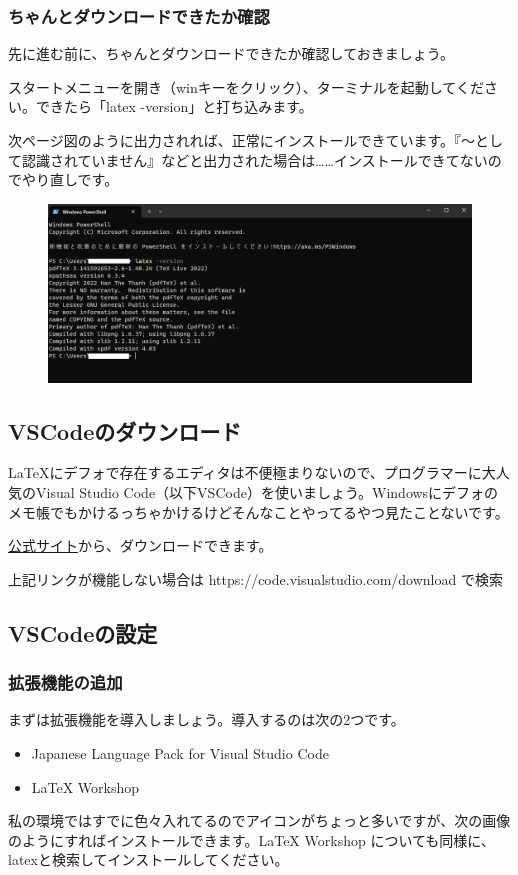 \documentclass[uplatex,dvipdfmx]{jsarticle}
\numberwithin{equation}{section}
\begin{document}
\subsubsection{ちゃんとダウンロードできたか確認}
先に進む前に、ちゃんとダウンロードできたか確認しておきましょう。

スタートメニューを開き（winキーをクリック）、ターミナルを起動してください。できたら「latex -version」と打ち込みます。

次ページ図のように出力されれば、正常にインストールできています。『～として認識されていません』などと出力された場合は……インストールできてないのでやり直しです。
\begin{figure}[htbp]
  \centering
  \includegraphics[width=0.7\linewidth]{powershell.png}
\end{figure}
\subsection*{VSCodeのダウンロード}
\LaTeX にデフォで存在するエディタは不便極まりないので、プログラマーに大人気のVisual Studio Code（以下VSCode）を使いましょう。Windowsにデフォのメモ帳でもかけるっちゃかけるけどそんなことやってるやつ見たことないです。

\href{https://code.visualstudio.com/download}{公式サイト}から、ダウンロードできます。

上記リンクが機能しない場合は https://code.visualstudio.com/download で検索
\subsection*{VSCodeの設定}
\subsubsection{拡張機能の追加}
まずは拡張機能を導入しましょう。導入するのは次の2つです。
\begin{itemize}
  \item Japanese Language Pack for Visual Studio Code
  \item LaTeX Workshop
\end{itemize}
私の環境ではすでに色々入れてるのでアイコンがちょっと多いですが、次の画像のようにすればインストールできます。LaTeX Workshop についても同様に、latexと検索してインストールしてください。
\end{document}
